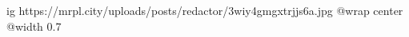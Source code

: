  
 
 
 
 

\ifcmt
  ig https://mrpl.city/uploads/posts/redactor/3wiy4gmgxtrjjs6a.jpg
  @wrap center
  @width 0.7
\fi
